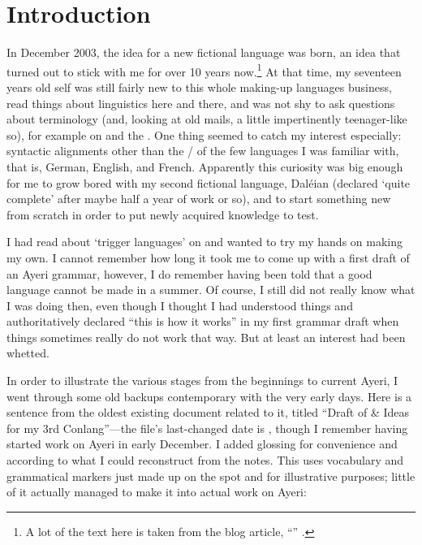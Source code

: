 \setcounter{chapter}{-1}
\chapter{Introduction}

In December 2003, the idea for a new fictional language was born, an idea that 
turned out to stick with me for over 10 years now.\footnote{A lot of the text 
here is taken from the blog article, ``'' 
\parencite{benung:happybirthday}.} At that time, my seventeen years old self 
was still fairly new to this whole making-up languages business, read things 
about linguistics here and there, and was not shy to ask questions about 
terminology (and, looking at old mails, a little impertinently teenager-like 
so), for example on  and the . One 
thing seemed to catch my interest especially: syntactic alignments other than 
the \Nom{}/\Acc{} of the few languages I was familiar with, that is, German, 
English, and French. Apparently this curiosity was big enough for me to grow 
bored with my second fictional language, Daléian (declared `quite complete' 
after maybe half a year of work or so), and to start something new from scratch 
in order to put newly acquired knowledge to test.

I had read about `trigger languages' on  and wanted to try my 
hands on making my own. I cannot remember how long it took me to come up with a 
first draft of an Ayeri grammar, however, I do remember having been told that a 
good language cannot be made in a summer. Of course, I still did not really 
know what I was doing then, even though I thought I had understood things and 
authoritatively declared ``this is how it works'' in my first grammar draft 
when things sometimes really do not work that way. But at least an interest had 
been whetted.

In order to illustrate the various stages from the beginnings to current Ayeri,
I went through some old backups contemporary with the very early days. 
Here is a sentence from the oldest existing document related to it, titled 
``Draft of \& Ideas for my 3rd Conlang''---the file's last-changed date is 
, though I remember having started work on Ayeri in early 
December. I added glossing for convenience and according to what I could 
reconstruct from the notes. This uses vocabulary and grammatical markers just 
made up on the spot and for illustrative purposes; little of it actually 
managed to make it into actual work on Ayeri:

